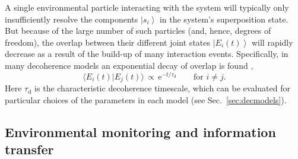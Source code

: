 \documentclass[aps,pra,reprint,amsmath,amssymb,showpacs,nofootinbib,floatfix,onecolumn,12pt]{revtex4-1}
\newcommand{\ket}[1]{\left\vert{#1}\right\rangle}
\newcommand{\braket}[2]{\ensuremath{{\langle #1}|{#2 \rangle}}}
\newcommand{\E}{\text{e}}
\begin{document}
A single environmental particle interacting with the system will typically only insufficiently resolve the components $\ket{s_i}$ in the system's superposition state. But because of the large number of such particles (and, hence, degrees of freedom), the overlap between their different joint states $\ket{E_i(t)}$ will rapidly decrease as a result of the build-up of many interaction events. Specifically, in many decoherence models an exponential decay of overlap is found \cite{Zurek:1982:tv,Joos:1985:iu,Paz:1993:ta,Leggett:1987:pm,Mokarzel:2002:za,Hornberger:2003:un,Zurek:2002:ii,Schlosshauer:2007:un,Breuer:2002:oq},
%
\begin{equation}
  \label{eq:jkHjkfhjhPJHyudf615}
  \braket{E_i(t)}{E_j(t)} \, \propto \, \E^{-t/\tau_\text{d}} \qquad \text{for $i \not= j$}.
\end{equation}
%
Here $\tau_\text{d}$ is the characteristic decoherence timescale, which can be evaluated for particular choices of the parameters in each model (see Sec.~\ref{sec:decmodels}). 



\subsection{\label{sec:envir-monit-inform}Environmental monitoring and information transfer}
\end{document}
